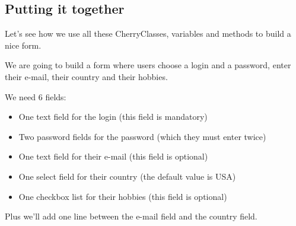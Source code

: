 \subsection{Putting it together}

Let's see how we use all these CherryClasses, variables and methods to build a nice form.

We are going to build a form where users choose a login and a password, enter their e-mail, their country and their
hobbies.

We need 6 fields:
\begin{itemize}
\item
One text field for the login (this field is mandatory)
\item
Two password fields for the password (which they must enter twice)
\item
One text field for their e-mail (this field is optional)
\item
One select field for their country (the default value is USA)
\item
One checkbox list for their hobbies (this field is optional)
\end{itemize}

Plus we'll add one line between the e-mail field and the country field.

